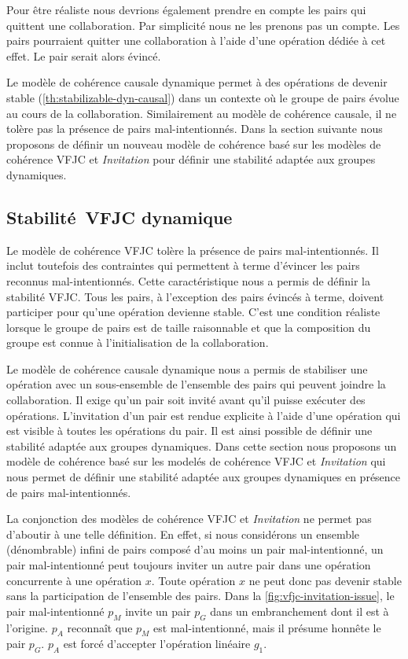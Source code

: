 Pour être réaliste nous devrions également prendre en compte les pairs qui quittent une collaboration.
Par simplicité nous ne les prenons pas un compte.
Les pairs pourraient quitter une collaboration à l'aide d'une opération dédiée à cet effet.
Le pair serait alors évincé.

Le modèle de cohérence causale dynamique permet à des opérations de devenir stable (\autoref{th:stabilizable-dyn-causal}) dans un contexte où le groupe de pairs évolue au cours de la collaboration.
Similairement au modèle de cohérence causale, il ne tolère pas la présence de pairs mal-intentionnés.
Dans la section suivante nous proposons de définir un nouveau modèle de cohérence basé sur les modèles de cohérence \acs{VFJC} et \emph{Invitation} pour définir une stabilité adaptée aux groupes dynamiques.


\subsection{Stabilité~\acl{VFJC} dynamique}\label{subsec:dvfjcs}

Le modèle de cohérence \ac{VFJC} tolère la présence de pairs mal-intentionnés.
Il inclut toutefois des contraintes qui permettent à terme d'évincer les pairs reconnus mal-intentionnés.
Cette caractéristique nous a permis de définir la stabilité \ac{VFJC}.
Tous les pairs, à l'exception des pairs évincés à terme, doivent participer pour qu'une opération devienne stable.
C'est une condition réaliste lorsque le groupe de pairs est de taille raisonnable et que la composition du groupe est connue à l'initialisation de la collaboration.

Le modèle de cohérence causale dynamique nous a permis de stabiliser une opération avec un sous-ensemble de l'ensemble des pairs qui peuvent joindre la collaboration.
Il exige qu'un pair soit invité avant qu'il puisse exécuter des opérations.
L'invitation d'un pair est rendue explicite à l'aide d'une opération qui est visible à toutes les opérations du pair.
Il est ainsi possible de définir une stabilité adaptée aux groupes dynamiques.
Dans cette section nous proposons un modèle de cohérence basé sur les modelés de cohérence \acs{VFJC} et \emph{Invitation} qui nous permet de définir une stabilité adaptée aux groupes dynamiques en présence de pairs mal-intentionnés.

La conjonction des modèles de cohérence \acs{VFJC} et \emph{Invitation} ne permet pas d'aboutir à une telle définition.
En effet, si nous considérons un ensemble (dénombrable) infini de pairs composé d'au moins un pair mal-intentionné, un pair mal-intentionné peut toujours inviter un autre pair dans une opération concurrente à une opération $x$.
Toute opération $x$ ne peut donc pas devenir stable sans la participation de l'ensemble des pairs.
Dans la \autoref{fig:vfjc-invitation-issue}, le pair mal-intentionné $p_M$ invite un pair $p_G$ dans un embranchement dont il est à l'origine.
$p_A$ reconnaît que $p_M$ est mal-intentionné, mais il présume honnête le pair $p_G$.
$p_A$ est forcé d'accepter l'opération linéaire $g_1$.

